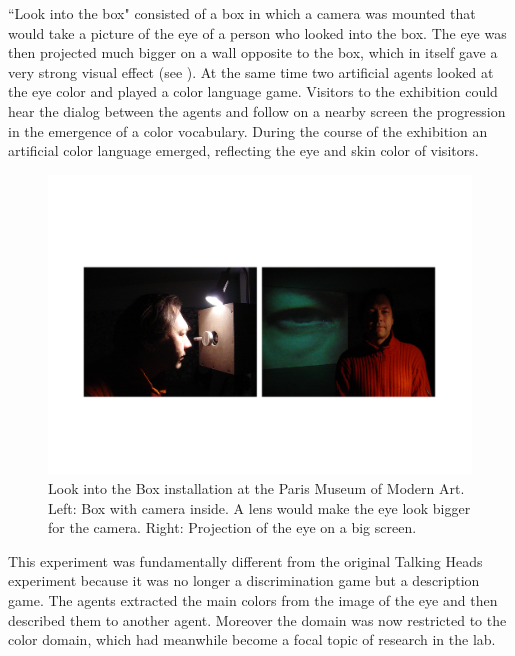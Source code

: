 ``Look into the box" consisted of a box in which a camera was mounted that would take a picture of the 
eye of a person who looked into the box. The eye was then projected much bigger on a wall opposite to the box, 
which in itself gave a very strong visual effect (see ). 
At the same time two artificial agents looked at the 
eye color and played a color language game. Visitors to the exhibition could hear the dialog between the agents 
and follow on a nearby screen the progression in the emergence of a color vocabulary. During the course of the 
exhibition an artificial color language emerged, reflecting the eye and skin color of visitors. 

\begin{figure}[htbp]
  \centerline{\includegraphics[width=.95\textwidth]{chap9/figs/look-into-box}}
\caption{\label{fig:lookintobox} 
Look into the Box installation at the Paris Museum of Modern Art. Left: Box with camera inside. A lens would make 
the eye look bigger for the camera. Right: Projection of the eye on a big screen.}
\end{figure}

This experiment was fundamentally 
different from the original Talking Heads experiment because it was no longer a discrimination game
but a description game. The agents extracted the main colors from the image of the eye and then described them to 
another agent. Moreover the domain was now restricted to the color domain, which had meanwhile 
become a focal topic of research in the lab.\cite{Steels:2005}

